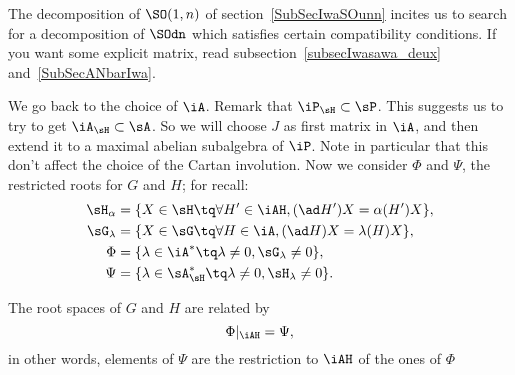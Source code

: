 The decomposition of $\SO(1,n)$ of section~\ref{SubSecIwaSOunn} incites us to search for a decomposition of $\SOdn$ which satisfies certain compatibility conditions. If you want some explicit matrix, read subsection~\ref{subsecIwasawa_deux} and~\ref{SubSecANbarIwa}.

We go back to the choice of $\iA$. Remark that $\iP_{\sH}\subset\sP$. This suggests us to try to get $\iA_{\sH}\subset\sA$. So we will choose $J$ as first matrix in $\iA$, and then extend it to a maximal abelian subalgebra of $\iP$. Note in particular that this don't affect the choice of the Cartan involution. Now we consider $\Phi$ and $\Psi$, the restricted roots for $G$ and $H$; for recall:
\begin{equation}
	\begin{split}
		\sH_{\alpha}  &=\{ X\in\sH\tq \forall H'\in\iAH,(\ad H')X=\alpha(H')X \},\\
		\sG_{\lambda} &=\{ X\in\sG\tq \forall H\in\iA,(\ad H)X=\lambda(H)X \},\\
		\Phi        &=\{ \lambda\in\iA^*\tq \lambda\neq 0, \sG_{\lambda}\neq 0 \},\\
		\Psi        &=\{ \lambda\in\sA_{\sH}^*\tq \lambda\neq 0, \sH_{\lambda}\neq 0\}.
	\end{split}
\end{equation}

\begin{lemma}
	The root spaces of $G$ and $H$ are related by
	\[
		\Phi|_{\iAH}=\Psi,
	\]
	in other words, elements of $\Psi$ are the restriction to $\iAH$ of the ones of $\Phi$
\end{lemma}

